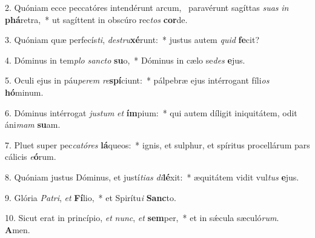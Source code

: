2. Quóniam ecce peccatóres intendérunt arcum, \dag\  paravérunt sagíttas \textit{su}\textit{as} \textit{in} \textbf{phá}retra,~*  ut sagíttent in obscúro rec\textit{tos} \textbf{cor}de.\

3. Quóniam quæ perfecís\textit{ti}, \textit{de}\textit{stru}\textbf{xé}runt:~*  justus autem \textit{quid} \textbf{fe}cit?\

4. Dóminus in tem\textit{plo} \textit{sanc}\textit{to} \textbf{su}o,~*  Dóminus in cælo se\textit{des} \textbf{e}jus.\

5. Oculi ejus in páu\textit{pe}\textit{rem} \textit{re}\textbf{spí}ciunt:~*  pálpebræ ejus intérrogant fíli\textit{os} \textbf{hó}minum.\

6. Dóminus intérrogat \textit{jus}\textit{tum} \textit{et} \textbf{ím}pium:~*  qui autem díligit iniquitátem, odit áni\textit{mam} \textbf{su}am.\

7. Pluet super pec\textit{ca}\textit{tó}\textit{res} \textbf{lá}queos:~*  ignis, et sulphur, et spíritus procellárum pars cálicis \textit{e}\textbf{ó}rum.\

8. Quóniam justus Dóminus, et justí\textit{ti}\textit{as} \textit{di}\textbf{lé}xit:~*  æquitátem vidit vul\textit{tus} \textbf{e}jus.\

9. Glória \textit{Pa}\textit{tri}, \textit{et} \textbf{Fí}lio,~*  et Spirítu\textit{i} \textbf{Sanc}to.\

10. Sicut erat in princípio, \textit{et} \textit{nunc}, \textit{et} \textbf{sem}per,~*  et in sǽcula sæculó\textit{rum}. \textbf{A}men.\

